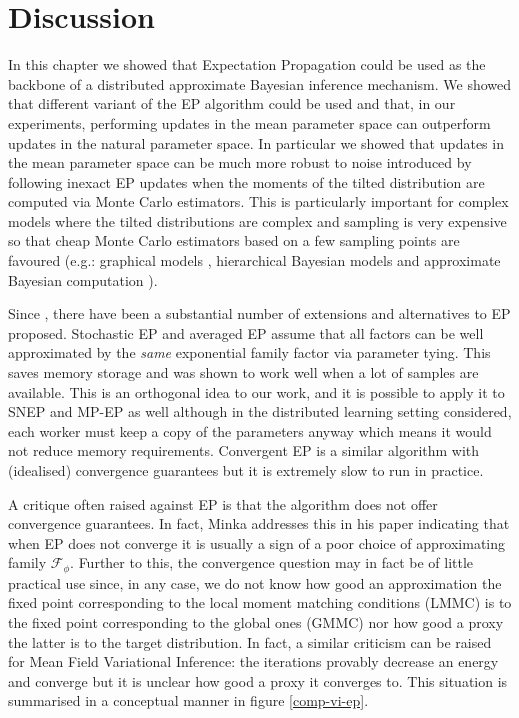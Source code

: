 \section{Discussion}

In this chapter we showed that Expectation Propagation could be used as the backbone of a distributed approximate Bayesian inference mechanism. 
We showed that different variant of the EP algorithm could be used and that, in our experiments, performing updates in the mean parameter space can outperform updates in the natural parameter space. 
In particular we showed that updates in the mean parameter space can be much more robust to noise introduced by following inexact EP updates when the moments of the tilted distribution are computed via Monte Carlo estimators. This is particularly important for complex models where the tilted distributions are complex and sampling is very expensive so that cheap Monte Carlo estimators based on a few sampling points are favoured (e.g.: graphical models \citep{heess13, eslami14, jitkrittum15}, hierarchical Bayesian models \citep{gelman14} and approximate Bayesian computation \citep{barthelme11}). %

Since \cite{minka01}, there have been a substantial number of extensions and alternatives to EP proposed. Stochastic EP \citep{li15} and averaged EP \citep{dehaene15} assume that all factors can be well approximated by the \emph{same} exponential family factor via parameter tying. This saves memory storage and was shown to work well when a lot of samples are available. This is an orthogonal idea to our work, and it is possible to apply it to SNEP and MP-EP as well although in the distributed learning setting considered, each worker must keep a copy of the parameters anyway which means it would not reduce memory requirements. Convergent EP \citep{heskes03} is a similar algorithm with (idealised) convergence guarantees but it is extremely slow to run in practice. 

A critique often raised against EP is that the algorithm does not offer convergence guarantees. In fact, Minka addresses this in his paper \citep{minka01} indicating that when EP does not converge it is usually a sign of a poor choice of approximating family $\mathcal F_{\phi}$. 
Further to this, the convergence question may in fact be of little practical use since, in any case, we do not know how good an approximation the fixed point corresponding to the local moment matching conditions (LMMC) is to the fixed point corresponding to the global ones (GMMC) nor how good a proxy the latter is to the target distribution. In fact, a similar criticism can be raised for Mean Field Variational Inference: the iterations provably decrease an energy and converge but it is unclear how good a proxy it converges to. This situation is summarised in a conceptual manner in figure \ref{comp-vi-ep}.

